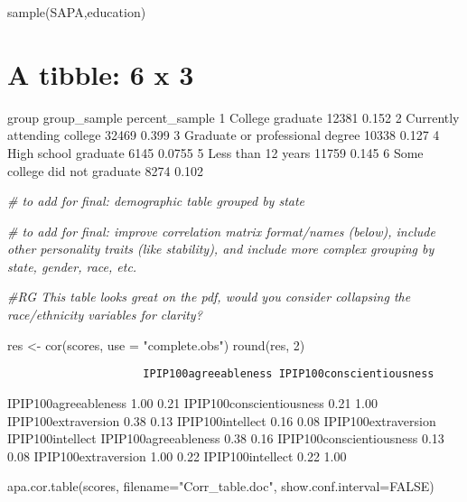 \documentclass[
]{article}
\newenvironment{Shaded}{\begin{snugshade}}{\end{snugshade}}
\newcommand{\AttributeTok}[1]{\textcolor[rgb]{0.77,0.63,0.00}{#1}}
\newcommand{\CommentTok}[1]{\textcolor[rgb]{0.56,0.35,0.01}{\textit{#1}}}
\newcommand{\ConstantTok}[1]{\textcolor[rgb]{0.00,0.00,0.00}{#1}}
\newcommand{\DecValTok}[1]{\textcolor[rgb]{0.00,0.00,0.81}{#1}}
\newcommand{\FunctionTok}[1]{\textcolor[rgb]{0.00,0.00,0.00}{#1}}
\newcommand{\NormalTok}[1]{#1}
\newcommand{\OtherTok}[1]{\textcolor[rgb]{0.56,0.35,0.01}{#1}}
\newcommand{\StringTok}[1]{\textcolor[rgb]{0.31,0.60,0.02}{#1}}
\begin{document}
\begin{Shaded}
\begin{Highlighting}[]
\FunctionTok{sample}\NormalTok{(SAPA,education)}
\end{Highlighting}
\end{Shaded}

\hypertarget{a-tibble-6-x-3}{%
\section{A tibble: 6 x 3}\label{a-tibble-6-x-3}}

group group\_sample percent\_sample
1 College graduate 12381 0.152
2 Currently attending college 32469 0.399
3 Graduate or professional degree 10338 0.127
4 High school graduate 6145 0.0755
5 Less than 12 years 11759 0.145
6 Some college did not graduate 8274 0.102

\begin{Shaded}
\begin{Highlighting}[]
\CommentTok{\# to add for final: demographic table grouped by state}

\CommentTok{\# to add for final:  improve correlation matrix format/names (below), include other personality traits (like stability), and include more complex grouping by state, gender, race, etc.}

\CommentTok{\#RG This table looks great on the pdf, would you consider collapsing the race/ethnicity variables for clarity?}

\NormalTok{res }\OtherTok{\textless{}{-}} \FunctionTok{cor}\NormalTok{(scores, }\AttributeTok{use =} \StringTok{"complete.obs"}\NormalTok{)}
\FunctionTok{round}\NormalTok{(res, }\DecValTok{2}\NormalTok{)}
\end{Highlighting}
\end{Shaded}

\begin{verbatim}
                     IPIP100agreeableness IPIP100conscientiousness
\end{verbatim}

IPIP100agreeableness 1.00 0.21
IPIP100conscientiousness 0.21 1.00
IPIP100extraversion 0.38 0.13
IPIP100intellect 0.16 0.08
IPIP100extraversion IPIP100intellect
IPIP100agreeableness 0.38 0.16
IPIP100conscientiousness 0.13 0.08
IPIP100extraversion 1.00 0.22
IPIP100intellect 0.22 1.00

\begin{Shaded}
\begin{Highlighting}[]
\FunctionTok{apa.cor.table}\NormalTok{(scores, }\AttributeTok{filename=}\StringTok{"Corr\_table.doc"}\NormalTok{, }\AttributeTok{show.conf.interval=}\ConstantTok{FALSE}\NormalTok{)}
\end{Highlighting}
\end{Shaded}
\end{document}
